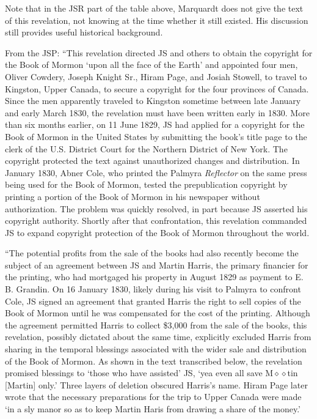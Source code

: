 				Note that in the JSR part of the table above, Marquardt does not give the text of this revelation, not knowing at the time whether it still existed. His discussion still provides useful historical background.
				
				From the JSP: ``This revelation directed JS and others to obtain the copyright for the Book of Mormon `upon all the face of the Earth' and appointed four men, Oliver Cowdery, Joseph Knight Sr., Hiram Page, and Josiah Stowell, to travel to Kingston, Upper Canada, to secure a copyright for the four provinces of Canada. Since the men apparently traveled to Kingston sometime between late January and early March 1830, the revelation must have been written early in 1830. More than six months earlier, on 11 June 1829, JS had applied for a copyright for the Book of Mormon in the United States by submitting the book's title page to the clerk of the U.S. District Court for the Northern District of New York. The copyright protected the text against unauthorized changes and distribution. In January 1830, Abner Cole, who printed the Palmyra \textit{Reflector} on the same press being used for the Book of Mormon, tested the prepublication copyright by printing a portion of the Book of Mormon in his newspaper without authorization. The problem was quickly resolved, in part because JS asserted his copyright authority. Shortly after that confrontation, this revelation commanded JS to expand copyright protection of the Book of Mormon throughout the world.
				
				``The potential profits from the sale of the books had also recently become the subject of an agreement between JS and Martin Harris, the primary financier for the printing, who had mortgaged his property in August 1829 as payment to E. B. Grandin. On 16 January 1830, likely during his visit to Palmyra to confront Cole, JS signed an agreement that granted Harris the right to sell copies of the Book of Mormon until he was compensated for the cost of the printing. Although the agreement permitted Harris to collect \$3,000 from the sale of the books, this revelation, possibly dictated about the same time, explicitly excluded Harris from sharing in the temporal blessings associated with the wider sale and distribution of the Book of Mormon. As shown in the text transcribed below, the revelation promised blessings to `those who have assisted' JS, `yea even all save M$\diamond\diamond$tin [Martin] only.' Three layers of deletion obscured Harris's name. Hiram Page later wrote that the necessary preparations for the trip to Upper Canada were made `in a sly manor so as to keep Martin Haris from drawing a share of the money.'
				
